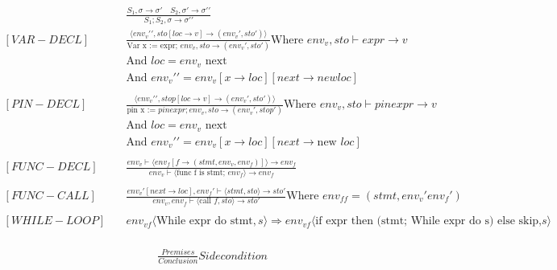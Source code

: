 \begin{align*}
    [COMPOSITION] \quad  &
    \frac
    {S_1, \sigma \rightarrow \sigma \prime \quad S_2, \sigma \prime \rightarrow \sigma \prime \prime}
    {S_1;S_2, \sigma \rightarrow \sigma \prime \prime}
    \\
    [VAR-DECL]     \quad &
    \frac
    {\langle env_v\prime \prime, sto[loc \to v] \to (env_v\prime, sto\prime)\rangle}
    {\text{Var x := expr; }env_v,sto \to (env_v\prime, sto\prime)}
    \text{Where } env_v, sto \vdash expr \to v                                                \\
                         & \text{And } loc = env_v \text{ next}                               \\
                         & \text{And } env_v\prime \prime = env_v[x\to loc][next \to new loc]
    \\
    \\
    [PIN-DECL] \quad     &
    \frac
    {\langle env_v\prime \prime, stop[loc\to v]\to (env_v\prime, sto\prime) \rangle}
    {\text{pin x := }pinexpr; env_v, sto \to (env_v\prime, stop\prime)}
    \text{Where } env_v,sto\vdash pinexpr \to v                                               \\
                         & \text{And }loc = env_v \text{ next}   \\
                         & \text{And }env_v\prime \prime = env_v[x\to loc][next\to \text{new }loc]
    \\
    \\
    [FUNC-DECL] \quad &
    \frac
    {env_v\vdash\langle env_f[f \to (stmt, env_v, env_f)]\rangle \to env_f}
    {env_v \vdash \langle \text{func f is stmt; } env_f \rangle \to env_f}
    \\
    \\
    [FUNC-CALL] \quad &
    \frac
    {env_v\prime [next \to loc], env_f\prime \vdash \langle stmt, sto \rangle \to sto\prime}
    {env_v, env_f \vdash \langle \text{call }f, sto\rangle \to sto\prime}
    \text{Where }env_{ff} = (stmt, env_v\prime env_f\prime)
    \\
    \\
    [WHILE-LOOP] \quad &
    env_{vf} \langle \text{While expr do stmt}, s \rangle \Rightarrow env_{vf} \langle \text{if expr then (stmt; While expr do s) else skip,} s \rangle
    \\
\end{align*}


\begin{align*}
    [RULE]     \quad &
    \frac
    {Premises}
    {Conclusion}
    Side condition
\end{align*}
